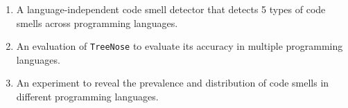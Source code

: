 \begin{enumerate}
    \item A language-independent code smell detector that detects 5 types of
        code smells across programming languages.
    \item An evaluation of \texttt{TreeNose} to evaluate its accuracy in
        multiple programming languages.
    \item An experiment to reveal the prevalence and distribution of code smells
        in different programming languages.
\end{enumerate}

